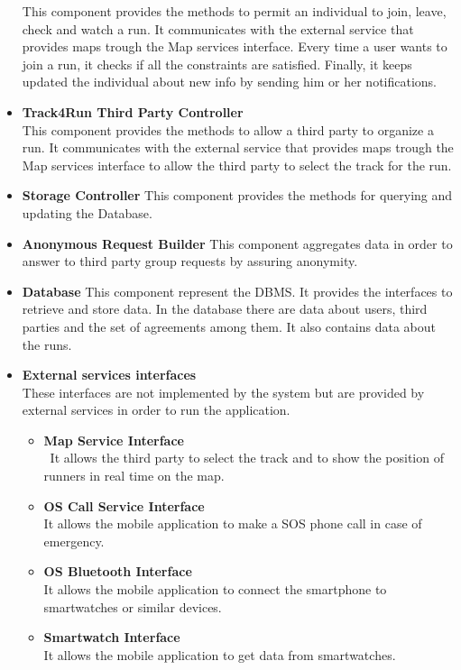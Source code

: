 \begin{legal}
\begin{itemize}
{		This component provides the methods to permit an individual to join, leave, check and watch a run. It communicates with the external service that provides maps trough the Map services interface. Every time a user wants to join a run, it checks if all the constraints are satisfied. Finally, it keeps updated the individual about new info by sending him or her notifications.
				}\\
		\item{\textbf{Track4Run Third Party Controller}\\
		This component provides the methods to allow a third party to organize a run. It communicates with the external service that provides maps trough the Map services interface to allow the third party to select the track for the run.
				}\\				
		\item{\textbf{Storage Controller}
		This component provides the methods for querying and updating the Database.
				}\\
		\item{\textbf{Anonymous Request Builder}
		This component aggregates data in order to answer to third party group requests by assuring anonymity.
				}\\
		\item{\textbf{Database}
		This component represent the DBMS. It provides the interfaces to retrieve and store data. In the database there are data about users, third parties and the set of agreements among them. It also contains data about the runs.
				}\\
		\item{\textbf{External services interfaces}\\
		These interfaces are not implemented by the system but are provided by external services in order to run the application.
      	\begin{itemize}
		  	\item{\textbf{Map Service Interface}\\\
		  	It allows the third party to select the track and to show the position of runners in real time on the map.
						}\\
			\item{\textbf{OS Call Service Interface}\\
			It allows the mobile application to make a SOS phone call in case of emergency.
						}\\
			\item{\textbf{OS Bluetooth Interface}\\
			It allows the mobile application to connect the smartphone to smartwatches or similar devices.
						}\\
			\item{\textbf{Smartwatch Interface}\\
			It allows the mobile application to get data from smartwatches.
						}\\
      	\end{itemize}
				}
		\end{itemize}


\end{legal}
